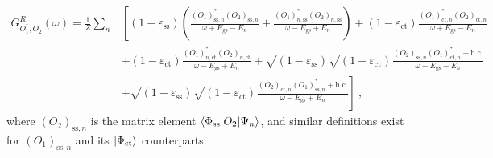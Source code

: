 \documentclass{iopart}
\begin{document}
\begin{eqnarray}
	G^R_{O_1^\dagger,O_2}(\omega) = \frac{1}{Z}\sum_n &\left[\left(1 - \varepsilon_\text{ss} \right) \left(\frac{\left(O_1\right)_{\text{ss},n}^* \left( O_2 \right)_{\text{ss}, n}}{\omega + E_\text{gs} - E_n} + \frac{\left(O_1\right)_{n,\text{ss}}^* \left( O_2 \right)_{n,\text{ss}}}{\omega - E_\text{gs} + E_n}\right) + \left(1 - \varepsilon_\text{ct} \right) \frac{\left(O_1\right)_{\text{ct},n}^* \left( O_2 \right)_{\text{ct}, n}}{\omega + E_\text{gs} - E_n}\right.\nonumber\\
						&\left. + \left(1 - \varepsilon_\text{ct} \right)\frac{\left(O_1\right)_{n,\text{ct}}^* \left( O_2 \right)_{n,\text{ct}}}{\omega - E_\text{gs} + E_n} + \sqrt{\left(1 - \varepsilon_\text{ss} \right)}\sqrt{\left(1 - \varepsilon_\text{ct} \right)} \frac{\left(O_2\right)_{\text{ss},n} \left( O_1 \right)_{\text{ct},n}^* + \text{h.c.}}{\omega + E_\text{gs} - E_n} \right. \nonumber\\
		&\left.+ \sqrt{\left(1 - \varepsilon_\text{ss} \right)}\sqrt{\left(1 - \varepsilon_\text{ct} \right)}\frac{\left(O_2\right)_{\text{ct},n} \left( O_1 \right)_{\text{ss},n}^* + \text{h.c.}}{\omega - E_\text{gs} + E_n}\right]~,
\end{eqnarray}
where \(\left( O_2 \right)_{\text{ss},n} \) is the matrix element \(\braket{\Phi_\text{ss} | O_2 | \Psi_n}\), and similar definitions exist for \(\left( O_1 \right)_{\text{ss},n} \) and its \(\ket{\Phi_\text{ct}}\) counterparts.
\end{document}
